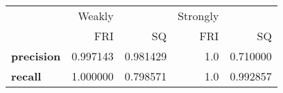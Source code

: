 \begin{tabular}{lrrrr}
\toprule
{} &    Weakly &           & Strongly &           \\
{} &       FRI &        SQ &      FRI &        SQ \\
\midrule
\textbf{precision} &  0.997143 &  0.981429 &      1.0 &  0.710000 \\
\textbf{recall   } &  1.000000 &  0.798571 &      1.0 &  0.992857 \\
\bottomrule
\end{tabular}
